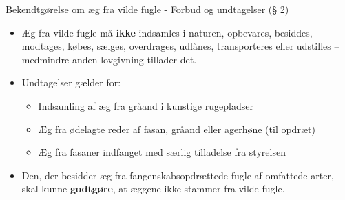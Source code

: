 \begin{frame}{Bekendtgørelse om æg fra vilde fugle - Forbud og undtagelser (§ 2)}
\vspace{1em}

\small

\raggedright

\begin{itemize}

\itemsep0.6em %

\item Æg fra vilde fugle må \textbf{ikke} indsamles i naturen, opbevares, besiddes, modtages, købes, sælges, overdrages, udlånes, transporteres eller udstilles – medmindre anden lovgivning tillader det.

\item Undtagelser gælder for:
    \begin{itemize}
    \itemsep0.3em
    \item Indsamling af æg fra gråand i kunstige rugepladser
    \item Æg fra ødelagte reder af fasan, gråand eller agerhøne (til opdræt)
    \item Æg fra fasaner indfanget med særlig tilladelse fra styrelsen
    \end{itemize}

\item Den, der besidder æg fra fangenskabsopdrættede fugle af omfattede arter, skal kunne \textbf{godtgøre}, at æggene ikke stammer fra vilde fugle.

\end{itemize}

\end{frame}